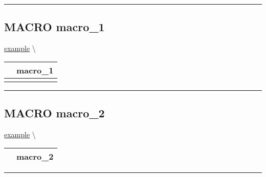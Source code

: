\par


\rule{\linewidth}{0.5pt}
\subsection*{\textsf{\colorbox{headtoc}{\color{white} MACRO}
macro\_1}}

\hypertarget{ecldoc:example.macro_1}{}
\hspace{0pt} \hyperlink{ecldoc:example}{example} \textbackslash 

{\renewcommand{\arraystretch}{1.5}
\begin{tabularx}{\textwidth}{|>{\raggedright\arraybackslash}l|X|}
\hline
\hspace{0pt}\mytexttt{\color{red} } & \textbf{macro\_1} \\
\hline
\multicolumn{2}{|>{\raggedright\arraybackslash}X|}{\hspace{0pt}\mytexttt{\color{param} (num\_1, num\_2)}} \\
\hline
\end{tabularx}
}

\par


\rule{\linewidth}{0.5pt}
\subsection*{\textsf{\colorbox{headtoc}{\color{white} MACRO}
macro\_2}}

\hypertarget{ecldoc:example.macro_2}{}
\hspace{0pt} \hyperlink{ecldoc:example}{example} \textbackslash 

{\renewcommand{\arraystretch}{1.5}
\begin{tabularx}{\textwidth}{|>{\raggedright\arraybackslash}l|X|}
\hline
\hspace{0pt}\mytexttt{\color{red} } & \textbf{macro\_2} \\
\hline
\end{tabularx}
}

\par


\rule{\linewidth}{0.5pt}


